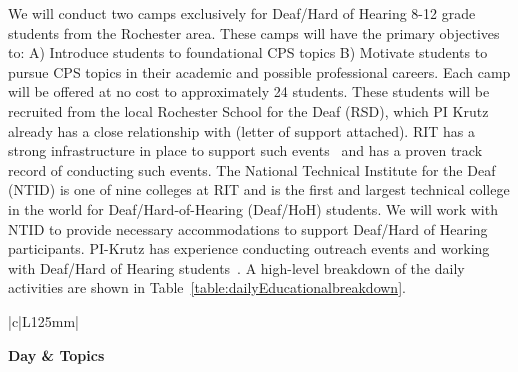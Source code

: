 \documentclass[11pt]{proposalnsf}
\begin{document}
\begin{sloppypar}
We will conduct two camps exclusively for Deaf/Hard of Hearing 8-12 grade students from the Rochester area. These camps will have the primary objectives to: A) Introduce students to foundational CPS topics B) Motivate students to pursue CPS topics in their academic and possible professional careers. Each camp will be offered at no cost to approximately 24 students. These students will be recruited from the local Rochester School for the Deaf (RSD)\cite{rsd_URL}, which PI Krutz already has a close relationship with (letter of support attached). RIT has a strong infrastructure in place to support such events~\cite{RIT_KidsofCampus_URL} and has a proven track record of conducting such events. The National Technical Institute for the Deaf (NTID)\cite{ntid_url} is one of nine colleges at RIT and is the first and largest technical college in the world for Deaf/Hard-of-Hearing (Deaf/HoH) students. We will work with NTID to provide necessary accommodations to support Deaf/Hard of Hearing participants. PI-Krutz has experience conducting outreach events and working with Deaf/Hard of Hearing students~\cite{7344327}. A high-level breakdown of the daily activities are shown in Table~\ref{table:dailyEducationalbreakdown}.


\begin{table}[h]

\begin{center}
\caption{Daily Breakdown of Educational Outreach Summer Workshop}
\label{table:dailyEducationalbreakdown}
\begin{tabular}{|c|L{125mm}| } \hline %

  \bfseries {}Day & \bfseries {}Topics \\ \hline




\end{tabular}
\end{center}
\end{table}
\end{sloppypar}
\end{document}
